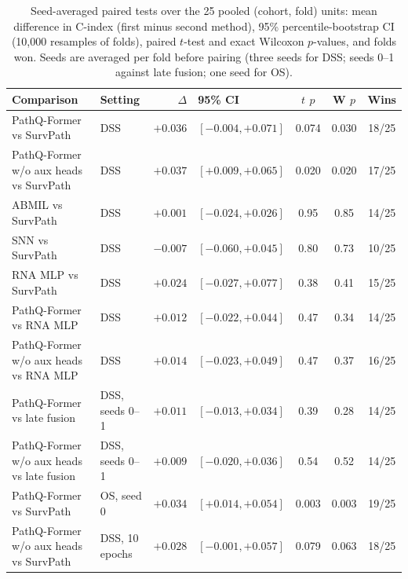\documentclass{article}
\newcommand{\pq}{PathQ-Former}
\newcommand{\cindex}{C-index}
\begin{document}
\begin{table}[t]
\caption{Seed-averaged paired tests over the 25 pooled (cohort, fold) units: mean difference in \cindex{} (first minus second method), 95\% percentile-bootstrap CI (10,000 resamples of folds), paired $t$-test and exact Wilcoxon $p$-values, and folds won. Seeds are averaged per fold before pairing (three seeds for DSS; seeds 0--1 against late fusion; one seed for OS).}
\label{tab:tests}
\centering
\small
\setlength{\tabcolsep}{4pt}
\begin{tabular}{@{}llrlccc@{}}
\toprule
Comparison & Setting & $\Delta$ & 95\% CI & $t$ $p$ & W $p$ & Wins \\
\midrule
\pq{} vs SurvPath & DSS & $+0.036$ & $[-0.004, +0.071]$ & 0.074 & 0.030 & 18/25 \\
\pq{} w/o aux heads vs SurvPath & DSS & $+0.037$ & $[+0.009, +0.065]$ & 0.020 & 0.020 & 17/25 \\
ABMIL vs SurvPath & DSS & $+0.001$ & $[-0.024, +0.026]$ & 0.95 & 0.85 & 14/25 \\
SNN vs SurvPath & DSS & $-0.007$ & $[-0.060, +0.045]$ & 0.80 & 0.73 & 10/25 \\
RNA MLP vs SurvPath & DSS & $+0.024$ & $[-0.027, +0.077]$ & 0.38 & 0.41 & 15/25 \\
\pq{} vs RNA MLP & DSS & $+0.012$ & $[-0.022, +0.044]$ & 0.47 & 0.34 & 14/25 \\
\pq{} w/o aux heads vs RNA MLP & DSS & $+0.014$ & $[-0.023, +0.049]$ & 0.47 & 0.37 & 16/25 \\
\pq{} vs late fusion & DSS, seeds 0--1 & $+0.011$ & $[-0.013, +0.034]$ & 0.39 & 0.28 & 14/25 \\
\pq{} w/o aux heads vs late fusion & DSS, seeds 0--1 & $+0.009$ & $[-0.020, +0.036]$ & 0.54 & 0.52 & 14/25 \\
\pq{} vs SurvPath & OS, seed 0 & $+0.034$ & $[+0.014, +0.054]$ & 0.003 & 0.003 & 19/25 \\
\pq{} w/o aux heads vs SurvPath & DSS, 10 epochs & $+0.028$ & $[-0.001, +0.057]$ & 0.079 & 0.063 & 18/25 \\
\bottomrule
\end{tabular}
\end{table}
\end{document}
